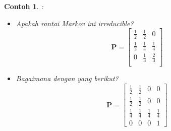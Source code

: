 \documentclass[11pt,b5paper,twoside]{book}
\newtheorem{ex}[theorem]{Contoh}
\begin{document}
	\begin{ex} \label{reducibelkah}:\\
		\begin{itemize}
		\item Apakah rantai Markov ini irreducible?
		$$
		\mathbf{P}=
		\begin{bmatrix}
		\frac{1}{2} & \frac{1}{2} & 0 \\
		\frac{1}{2} & \frac{1}{4} & \frac{1}{4} \\
		0 & \frac{1}{3} & \frac{2}{3} \\
		\end{bmatrix}%
		$$
		
		\item Bagaimana dengan yang berikut?
		$$
		\mathbf{P}=
		\begin{bmatrix}
		\frac{1}{2} & \frac{1}{2} & 0 & 0\\
		\frac{1}{2} & \frac{1}{2} & 0 & 0\\
		\frac{1}{4} & \frac{1}{4} &  \frac{1}{4} & \frac{1}{4}   \\
		0 &  0 & 0 &1
		\end{bmatrix}%
		$$
		\end{itemize}
	\end{ex}
\end{document}

